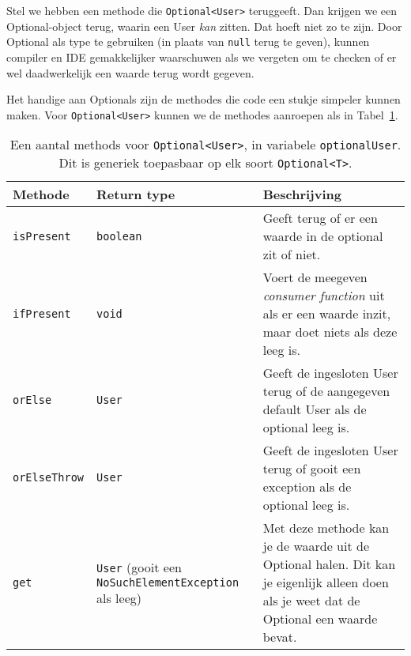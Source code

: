 \documentclass[dutch,a4paper,12pt,doubleside]{book}
\begin{document}
Stel we hebben een methode die \texttt{Optional<User>} teruggeeft. Dan krijgen we 
een Optional-object terug, waarin een User \textit{kan} zitten. Dat hoeft niet zo 
te zijn. Door Optional als type te gebruiken (in plaats van \texttt{null} terug te geven),
kunnen compiler en IDE gemakkelijker waarschuwen als we vergeten om te checken of 
er wel daadwerkelijk een waarde terug wordt gegeven.

Het handige aan Optionals zijn de methodes die code een stukje simpeler kunnen maken.
Voor \texttt{Optional<User>} kunnen we de methodes aanroepen als in Tabel~\ref{table:optional-methods}.

\begin{table}[H]
    \centering
    \begin{tabularx}{\textwidth}{
        |>{\raggedright}l|>{\raggedright}X|>{\raggedright\arraybackslash}X|
    }
    \hline
    \textbf{Methode} 
    & \textbf{Return type} 
    & \textbf{Beschrijving} 
    \\ \hline
        
    \texttt{isPresent}
    & \texttt{boolean}
    & Geeft terug of er een waarde in de optional zit of niet.
    \\ \hline

    \texttt{ifPresent}
    & \texttt{void}
    & Voert de meegeven \textit{consumer function} uit als er een waarde inzit, maar 
    doet niets als deze leeg is.
    \\ \hline

    \texttt{orElse}
    & \texttt{User}
    & Geeft de ingesloten User terug of de aangegeven default User als de optional leeg is.
    \\ \hline

    \texttt{orElseThrow}
    & \texttt{User}
    & Geeft de ingesloten User terug of gooit een exception als de optional leeg is.
    \\ \hline

    \texttt{get}
    & \texttt{User} (gooit een \texttt{NoSuchElementException} als leeg)
    & Met deze methode kan je de waarde uit de Optional halen. 
    Dit kan je eigenlijk alleen doen als je weet dat de Optional een waarde bevat. 
    \\ \hline

    \end{tabularx}
    \caption{Een aantal methods voor \texttt{Optional<User>}, in variabele \texttt{optionalUser}.
    Dit is generiek toepasbaar op elk soort \texttt{Optional<T>}.}
    \label{table:optional-methods}
    \centering
\end{table}
\end{document}
